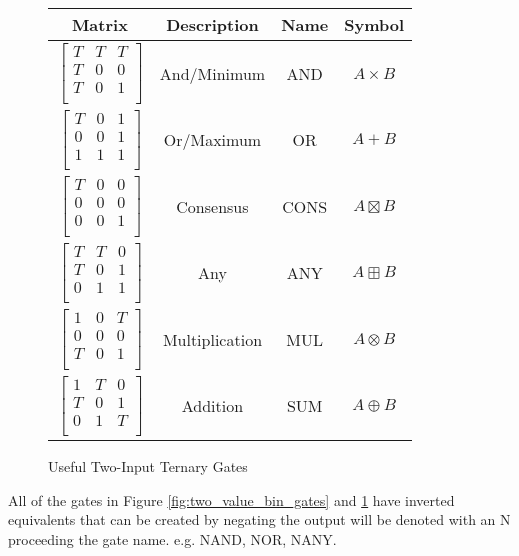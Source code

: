 \documentclass[12pt]{article}
\begin{document}
\begin{figure}[h]
    \centering
    \begin{tabular}{c|c|c|c}
        Matrix & Description & Name & Symbol \\
        \hline
        $\begin{bmatrix}T & T & T \\ T & 0 & 0 \\ T & 0 & 1 \\\end{bmatrix}$ & And/Minimum & AND & $A \times B$ \\
        $\begin{bmatrix}T & 0 & 1 \\ 0 & 0 & 1 \\ 1 & 1 & 1 \\\end{bmatrix}$ & Or/Maximum & OR & $A + B$ \\
        $\begin{bmatrix}T & 0 & 0 \\ 0 & 0 & 0 \\ 0 & 0 & 1 \\\end{bmatrix}$ & Consensus & CONS & $A \boxtimes B$ \\
        $\begin{bmatrix}T & T & 0 \\ T & 0 & 1 \\ 0 & 1 & 1 \\\end{bmatrix}$ & Any & ANY & $A \boxplus B$ \\
        $\begin{bmatrix}1 & 0 & T \\ 0 & 0 & 0 \\ T & 0 & 1 \\\end{bmatrix}$ & Multiplication & MUL & $A \otimes B$ \\
        $\begin{bmatrix}1 & T & 0 \\ T & 0 & 1 \\ 0 & 1 & T \\\end{bmatrix}$ & Addition & SUM & $A \oplus B$ \\
    \end{tabular}
    \caption{Useful Two-Input Ternary Gates}
    \label{fig:two_value_ter_gates}
\end{figure}

All of the gates in Figure \ref{fig:two_value_bin_gates} and \ref{fig:two_value_ter_gates} have inverted equivalents that can be
created by negating the output will be denoted with an N proceeding the gate name. e.g. NAND, NOR, NANY.\\
\end{document}
